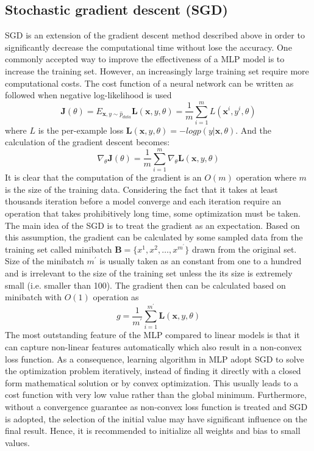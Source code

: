 \subsection{Stochastic gradient descent (SGD)}
SGD is an extension of the gradient descent method described above in order to significantly decrease the computational time without lose the accuracy.
One commonly accepted way to improve the effectiveness of a MLP model is to increase the training set.
However, an increasingly large training set require more computational costs.
The cost function of a neural network can be written as followed when negative log-likelihood is used
\begin{equation}
    \mathbf{J}(\theta) = E_{\mathbf{x},y\sim\hat{p}_{data}}\mathbf{L}(\mathbf{x},y,\theta)
    =\frac{1}{m}\sum^m_{i=1}L(\mathbf{x}^{i},y^{i},\theta)
\end{equation}
%
where $L$ is the per-example loss $\mathbf{L}(\mathbf{x},y,\theta)=-log p(y|\mathbf{x},\theta)$.
And the calculation of the gradient descent becomes:
\begin{equation}
    \nabla_{\theta} \mathbf{J}(\theta)
    =\frac{1}{m}\sum^m_{i=1}\nabla_\theta \mathbf{L} (\mathbf{x},y,\theta)
\end{equation}
%
It is clear that the computation of the gradient is an $O(m)$ operation where $m$ is the size of the training data.
Considering the fact that it takes at least thousands iteration before a model converge and each iteration require an operation that takes prohibitively long time, some optimization must be taken.
The main idea of the SGD is to treat the gradient as an expectation.
Based on this assumption, the gradient can be calculated by some sampled data from the training set called minibatch $\mathbf{B}=\{x^{1},x^{2},\dots,x^{m^\prime}\}$ drawn from the original set.
Size of the minibatch $m^\prime$ is usually taken as an constant from one to a hundred and is irrelevant to the size of the training set unless the its size is extremely small (i.e. smaller than 100).
The gradient then can be calculated based on minibatch with $O(1)$ operation as
\begin{equation}
    g
    =\frac{1}{m^\prime} \sum^{m^\prime}_{i=1} \mathbf{L} (\mathbf{x},y,\theta)
\end{equation}
%
The most outstanding feature of the MLP compared to linear models is that it can capture non-linear features automatically which also result in a non-convex loss function.
As a consequence, learning algorithm in MLP adopt SGD to solve the optimization problem iteratively, instead of finding it directly with a closed form mathematical solution or by convex optimization.
This usually leads to a cost function with very low value rather than the global minimum.
Furthermore, without a convergence guarantee as non-convex loss function is treated and SGD is adopted, the selection of the initial value may have significant influence on the final result.
Hence, it is recommended to initialize all weights and bias to small values.


